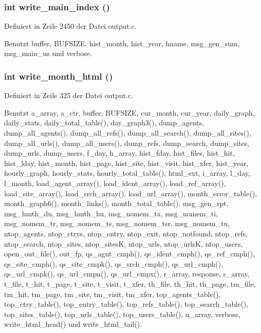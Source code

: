 \subsubsection{\setlength{\rightskip}{0pt plus 5cm}int write\_\-main\_\-index ()}\label{output_8h_90b458b70bbeed91acc9ec79062f6ac7}




Definiert in Zeile 2450 der Datei output.c.

Benutzt buffer, BUFSIZE, hist\_\-month, hist\_\-year, hname, msg\_\-gen\_\-sum, msg\_\-main\_\-us und verbose.
\subsubsection{\setlength{\rightskip}{0pt plus 5cm}int write\_\-month\_\-html ()}\label{output_8h_a88c70787fac7e72d1f6509b38b6bcab}




Definiert in Zeile 325 der Datei output.c.

Benutzt a\_\-array, a\_\-ctr, buffer, BUFSIZE, cur\_\-month, cur\_\-year, daily\_\-graph, daily\_\-stats, daily\_\-total\_\-table(), day\_\-graph3(), dump\_\-agents, dump\_\-all\_\-agents(), dump\_\-all\_\-refs(), dump\_\-all\_\-search(), dump\_\-all\_\-sites(), dump\_\-all\_\-urls(), dump\_\-all\_\-users(), dump\_\-refs, dump\_\-search, dump\_\-sites, dump\_\-urls, dump\_\-users, f\_\-day, h\_\-array, hist\_\-fday, hist\_\-files, hist\_\-hit, hist\_\-lday, hist\_\-month, hist\_\-page, hist\_\-site, hist\_\-visit, hist\_\-xfer, hist\_\-year, hourly\_\-graph, hourly\_\-stats, hourly\_\-total\_\-table(), html\_\-ext, i\_\-array, l\_\-day, l\_\-month, load\_\-agent\_\-array(), load\_\-ident\_\-array(), load\_\-ref\_\-array(), load\_\-site\_\-array(), load\_\-srch\_\-array(), load\_\-url\_\-array(), month\_\-error\_\-table(), month\_\-graph6(), month\_\-links(), month\_\-total\_\-table(), msg\_\-gen\_\-rpt, msg\_\-hmth\_\-du, msg\_\-hmth\_\-hu, msg\_\-nomem\_\-ta, msg\_\-nomem\_\-ti, msg\_\-nomem\_\-tr, msg\_\-nomem\_\-ts, msg\_\-nomem\_\-tsr, msg\_\-nomem\_\-tu, ntop\_\-agents, ntop\_\-ctrys, ntop\_\-entry, ntop\_\-exit, ntop\_\-notfound, ntop\_\-refs, ntop\_\-search, ntop\_\-sites, ntop\_\-sites\-K, ntop\_\-urls, ntop\_\-urls\-K, ntop\_\-users, open\_\-out\_\-file(), out\_\-fp, qs\_\-agnt\_\-cmph(), qs\_\-ident\_\-cmph(), qs\_\-ref\_\-cmph(), qs\_\-site\_\-cmph(), qs\_\-site\_\-cmpk(), qs\_\-srch\_\-cmph(), qs\_\-url\_\-cmph(), qs\_\-url\_\-cmpk(), qs\_\-url\_\-cmpn(), qs\_\-url\_\-cmpx(), r\_\-array, response, s\_\-array, t\_\-file, t\_\-hit, t\_\-page, t\_\-site, t\_\-visit, t\_\-xfer, th\_\-file, th\_\-hit, th\_\-page, tm\_\-file, tm\_\-hit, tm\_\-page, tm\_\-site, tm\_\-visit, tm\_\-xfer, top\_\-agents\_\-table(), top\_\-ctry\_\-table(), top\_\-entry\_\-table(), top\_\-refs\_\-table(), top\_\-search\_\-table(), top\_\-sites\_\-table(), top\_\-urls\_\-table(), top\_\-users\_\-table(), u\_\-array, verbose, write\_\-html\_\-head() und write\_\-html\_\-tail().